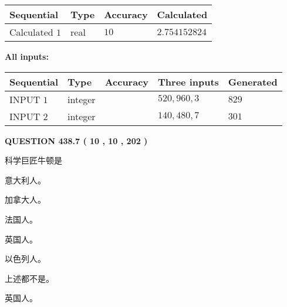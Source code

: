 \documentclass{ctexart}
\begin{document}
   
   
   
\noindent{}
   
   
  
  
\noindent\begin{tabular}{|l|l|l|l|}
\hline
 Sequential & Type & Accuracy & Calculated \\ 
\hline
 
 
  Calculated $  1 $ & real & $  10  $ & 
 $ 2.754152824 $ 
 \\  \hline  
 \end{tabular}
   
   
   
   
\noindent\vspace{0.1in}\hspace{-0.08in} {\textbf{\Large{All inputs: }}}
   
   
  
  
\noindent\begin{tabular}{|l|l|l|l|l|}
\hline
 Sequential & Type & Accuracy & Three inputs & Generated \\ 
\hline
 
 
  INPUT $  1 $ & integer &  & $
 520
 , 
 960
 , 
 3
 $ & $ 829 $ 
 \\  \hline  
 
 
  INPUT $  2 $ & integer &  & $
 140
 , 
 480
 , 
 7
 $ & $ 301 $ 
 \\  \hline  
 \end{tabular}
   
   
  
\vspace{0.2in}
  
{\textbf{\Large{QUESTION
438.7 
 ( 10 , 10 , 202 )
}}}
  
  
科学巨匠牛顿是
 
 
意大利人。
 
 
加拿大人。
 
 
法国人。
 
 
英国人。
 
 
以色列人。
 
 
 上述都不是。
 
 
\noindent{}
 
 
英国人。
 
\end{document}
